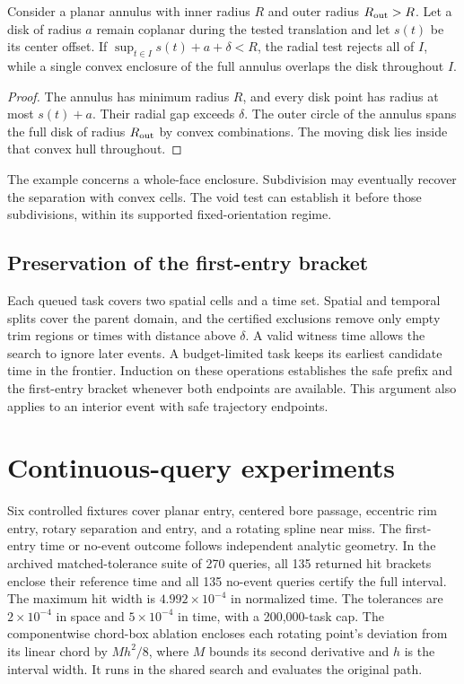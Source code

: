 \begin{proposition}
Consider a planar annulus with inner radius \(R\) and outer radius
\(R_{\rm out}>R\). Let a disk of radius \(a\) remain coplanar during
the tested translation and let \(s(t)\) be its center offset. If
\(\sup_{t\in I}s(t)+a+\delta<R\), the radial test rejects all of \(I\),
while a single convex enclosure of the full annulus overlaps the disk
throughout \(I\).
\end{proposition}
\begin{proof}
The annulus has minimum radius \(R\), and every disk point has radius
at most \(s(t)+a\). Their radial gap exceeds \(\delta\). The outer circle
of the annulus spans the full disk of radius \(R_{\rm out}\) by convex
combinations. The moving disk lies inside that convex hull throughout.
\end{proof}

The example concerns a whole-face enclosure. Subdivision may eventually
recover the separation with convex cells. The void test can establish it
before those subdivisions, within its supported fixed-orientation regime.

\subsection{Preservation of the first-entry bracket}

Each queued task covers two spatial cells and a time set. Spatial and
temporal splits cover the parent domain, and the certified exclusions
remove only empty trim regions or times with distance above \(\delta\).
A valid witness time allows the search to ignore later events. A
budget-limited task keeps its earliest candidate time in the frontier.
Induction on these operations establishes the safe prefix and the
first-entry bracket whenever both endpoints are available. This argument
also applies to an interior event with safe trajectory endpoints.

\section{Continuous-query experiments}
\label{sec:continuous-experiments}

Six controlled fixtures cover planar entry, centered bore passage,
eccentric rim entry, rotary separation and entry, and a rotating spline
near miss. The first-entry time or no-event outcome follows independent
analytic geometry. In the archived matched-tolerance suite of 270 queries,
all 135 returned hit brackets enclose their reference time and all 135
no-event queries certify the full interval. The maximum hit width is
\(4.992\times 10^{-4}\) in normalized time. The tolerances are
\(2\times10^{-4}\) in space and \(5\times10^{-4}\) in time, with a
200,000-task cap. The componentwise chord-box ablation encloses each
rotating point's deviation from its linear chord by \(M h^2/8\), where
\(M\) bounds its second derivative and \(h\) is the interval width.
It runs in the shared search and evaluates the original path.

